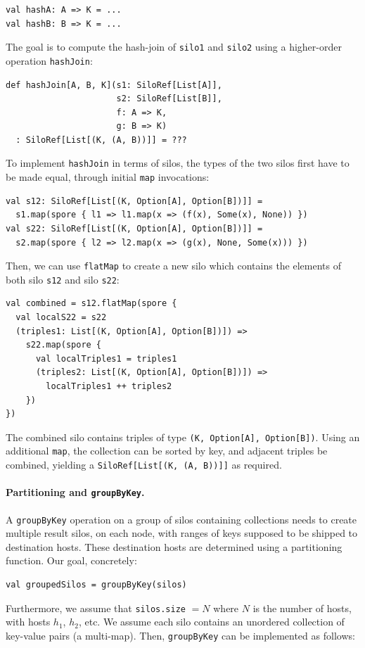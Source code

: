 \documentclass{jfp1}
\begin{document}
\begin{lstlisting}
val hashA: A => K = ...
val hashB: B => K = ...
\end{lstlisting}
\noindent
The goal is to compute the hash-join of \verb|silo1| and \verb|silo2| using a
higher-order operation \verb|hashJoin|:

\begin{lstlisting}
def hashJoin[A, B, K](s1: SiloRef[List[A]],
                      s2: SiloRef[List[B]],
                      f: A => K,
                      g: B => K)
  : SiloRef[List[(K, (A, B))]] = ???
\end{lstlisting}
\noindent
To implement \verb|hashJoin| in terms of silos, the types of the two silos first
have to be made equal, through initial \verb|map| invocations:

\begin{lstlisting}
val s12: SiloRef[List[(K, Option[A], Option[B])]] =
  s1.map(spore { l1 => l1.map(x => (f(x), Some(x), None)) })
val s22: SiloRef[List[(K, Option[A], Option[B])]] =
  s2.map(spore { l2 => l2.map(x => (g(x), None, Some(x))) })
\end{lstlisting}
\noindent
Then, we can use \verb|flatMap| to create a new silo which contains the elements
of both silo \verb|s12| and silo \verb|s22|:

\begin{lstlisting}
val combined = s12.flatMap(spore {
  val localS22 = s22
  (triples1: List[(K, Option[A], Option[B])]) =>
    s22.map(spore {
      val localTriples1 = triples1
      (triples2: List[(K, Option[A], Option[B])]) =>
        localTriples1 ++ triples2
    })
})
\end{lstlisting}
\noindent
The combined silo contains triples of type \verb|(K, Option[A], Option[B])|.
Using an additional \verb|map|, the collection can be sorted by key, and
adjacent triples be combined, yielding a \texttt{SiloRef[List[(K, (A, B))]]} as
required.

\paragraph{Partitioning and \texttt{groupByKey}.}

A \verb|groupByKey| operation on a group of silos containing collections needs
to create multiple result silos, on each node, with ranges of keys supposed to
be shipped to destination hosts. These destination hosts are determined using a
partitioning function. Our goal, concretely:

\begin{lstlisting}
val groupedSilos = groupByKey(silos)
\end{lstlisting}
\noindent
Furthermore, we assume that \verb|silos.size| $= N$ where $N$ is the number of
hosts, with hosts $h_1$, $h_2$, etc. We assume each silo contains an unordered
collection of key-value pairs (a multi-map). Then, \verb|groupByKey| can be
implemented as follows:
\end{document}
